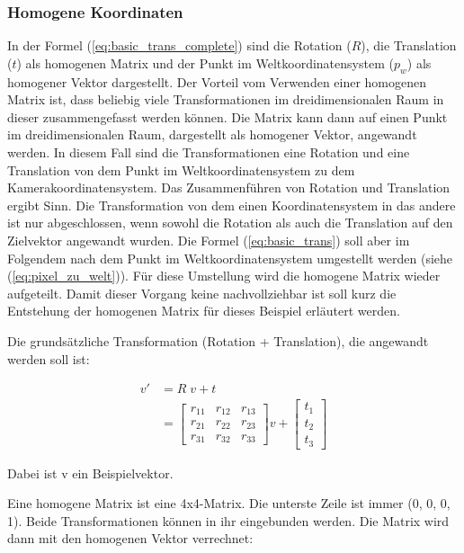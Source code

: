 		\subsubsection{Homogene Koordinaten}
		In der Formel (\ref{eq:basic_trans_complete}) sind die Rotation (\( R \)), die Translation (\( t \)) als homogenen Matrix und  der Punkt im Weltkoordinatensystem (\( p_w \)) als homogener Vektor dargestellt. Der Vorteil vom Verwenden einer homogenen Matrix ist, dass beliebig viele Transformationen im dreidimensionalen Raum in dieser zusammengefasst werden können. Die Matrix kann dann auf einen Punkt im dreidimensionalen Raum, dargestellt als homogener Vektor, angewandt werden. In diesem Fall sind die Transformationen eine Rotation und eine Translation von dem Punkt im Weltkoordinatensystem zu dem Kamerakoordinatensystem. Das Zusammenführen von Rotation und Translation ergibt Sinn. Die Transformation von dem einen Koordinatensystem in das andere ist nur abgeschlossen, wenn sowohl die Rotation als auch die Translation auf den Zielvektor angewandt wurden. Die Formel (\ref{eq:basic_trans}) soll aber im Folgendem nach dem Punkt im Weltkoordinatensystem umgestellt werden (siehe (\ref{eq:pixel_zu_welt})). Für diese Umstellung wird die homogene Matrix wieder aufgeteilt. Damit dieser Vorgang keine nachvollziehbar ist soll kurz die Entstehung der homogenen Matrix für dieses Beispiel erläutert werden.
		
		Die grundsätzliche Transformation (Rotation + Translation), die angewandt werden soll ist:
		
		\begin{equation}
			\begin{aligned}
				v' &= R \; v + t \\
				&= \begin{bmatrix}
				r_{11} & r_{12} & r_{13} \\ 
				r_{21} & r_{22} & r_{23} \\ 
				r_{31} & r_{32} & r_{33}
				\end{bmatrix} v + \begin{bmatrix}
				t_1 \\ t_2 \\ t_3
				\end{bmatrix}
			\end{aligned}
		\label{eq:rot_trans}
		\end{equation}
		
		Dabei ist v ein Beispielvektor.
		
		Eine homogene Matrix ist eine 4x4-Matrix. Die unterste Zeile ist immer (0, 0, 0, 1). Beide Transformationen können in ihr eingebunden werden. Die Matrix wird dann mit den homogenen Vektor verrechnet:
		
